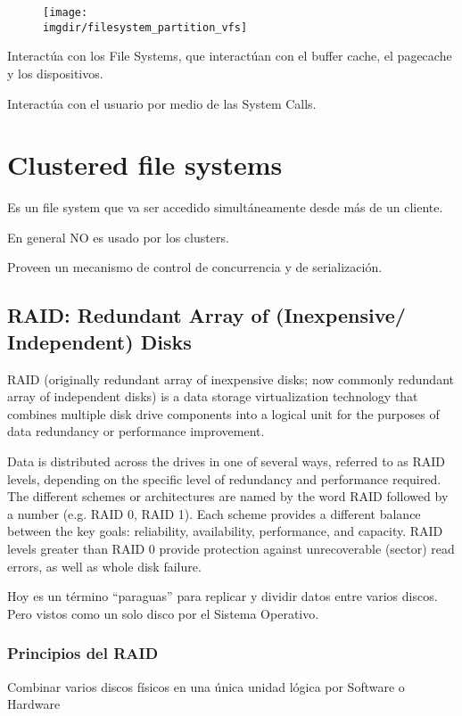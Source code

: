 \documentclass[a4paper, twoside]{article}
\newcommand{\imgdir}{../resources/images} %
\begin{document}
\begin{figure}[h]
	\centering
	\texttt{[image: \\imgdir/filesystem\_partition\_vfs]}
	\label{fig:filesystem_partition_vfs}
\end{figure}

Interactúa con los File Systems, que interactúan con el buffer cache, el pagecache y los dispositivos.

Interactúa con el usuario por medio de las System Calls.

\newpage
\section{Clustered file systems}
Es un file system que va ser accedido simultáneamente desde más de un cliente.

En general NO es usado por los clusters.

Proveen un mecanismo de control de concurrencia y de serialización.

\subsection{RAID: Redundant Array of (Inexpensive/ Independent) Disks}
RAID (originally redundant array of inexpensive disks; now commonly redundant array of independent disks) is a data storage virtualization technology that combines multiple disk drive components into a logical unit for the purposes of data redundancy or performance improvement.

Data is distributed across the drives in one of several ways, referred to as RAID levels, depending on the specific level of redundancy and performance required. The different schemes or architectures are named by the word RAID followed by a number (e.g. RAID 0, RAID 1). Each scheme provides a different balance between the key goals: reliability, availability, performance, and capacity. RAID levels greater than RAID 0 provide protection against unrecoverable (sector) read errors, as well as whole disk failure.

Hoy es un término ``paraguas'' para replicar y dividir datos entre varios discos. Pero vistos como un solo disco por el Sistema Operativo.


\subsubsection{Principios del RAID}
Combinar varios discos físicos en una única unidad lógica por Software o Hardware
\end{document}

